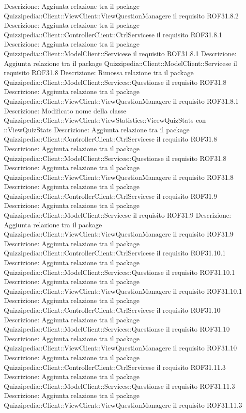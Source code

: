 Descrizione: Aggiunta relazione tra il package Quizzipedia::Client::ViewClient::ViewQuestionManagere il requisito ROF31.8.2 
Descrizione: Aggiunta relazione tra il package Quizzipedia::Client::ControllerClient::CtrlServicese il requisito ROF31.8.1 
Descrizione: Aggiunta relazione tra il package Quizzipedia::Client::ModelClient::Servicese il requisito ROF31.8.1 
Descrizione: Aggiunta relazione tra il package Quizzipedia::Client::ModelClient::Servicese il requisito ROF31.8 
Descrizione: Rimossa relazione tra il package Quizzipedia::Client::ModelClient::Services::Questionse il requisito ROF31.8 
Descrizione: Aggiunta relazione tra il package Quizzipedia::Client::ViewClient::ViewQuestionManagere il requisito ROF31.8.1 
Descrizione: Modificato nome della classe Quizzipedia::Client::ViewClient::ViewStatistics::VieewQuizStats con ::ViewQuizStats 
Descrizione: Aggiunta relazione tra il package Quizzipedia::Client::ControllerClient::CtrlServicese il requisito ROF31.8 
Descrizione: Aggiunta relazione tra il package Quizzipedia::Client::ModelClient::Services::Questionse il requisito ROF31.8 
Descrizione: Aggiunta relazione tra il package Quizzipedia::Client::ViewClient::ViewQuestionManagere il requisito ROF31.8 
Descrizione: Aggiunta relazione tra il package Quizzipedia::Client::ControllerClient::CtrlServicese il requisito ROF31.9 
Descrizione: Aggiunta relazione tra il package Quizzipedia::Client::ModelClient::Servicese il requisito ROF31.9 
Descrizione: Aggiunta relazione tra il package Quizzipedia::Client::ViewClient::ViewQuestionManagere il requisito ROF31.9 
Descrizione: Aggiunta relazione tra il package Quizzipedia::Client::ControllerClient::CtrlServicese il requisito ROF31.10.1 
Descrizione: Aggiunta relazione tra il package Quizzipedia::Client::ModelClient::Services::Questionse il requisito ROF31.10.1 
Descrizione: Aggiunta relazione tra il package Quizzipedia::Client::ViewClient::ViewQuestionManagere il requisito ROF31.10.1 
Descrizione: Aggiunta relazione tra il package Quizzipedia::Client::ControllerClient::CtrlServicese il requisito ROF31.10 
Descrizione: Aggiunta relazione tra il package Quizzipedia::Client::ModelClient::Services::Questionse il requisito ROF31.10 
Descrizione: Aggiunta relazione tra il package Quizzipedia::Client::ViewClient::ViewQuestionManagere il requisito ROF31.10 
Descrizione: Aggiunta relazione tra il package Quizzipedia::Client::ControllerClient::CtrlServicese il requisito ROF31.11.3 
Descrizione: Aggiunta relazione tra il package Quizzipedia::Client::ModelClient::Services::Questionse il requisito ROF31.11.3 
Descrizione: Aggiunta relazione tra il package Quizzipedia::Client::ViewClient::ViewQuestionManagere il requisito ROF31.11.3 
